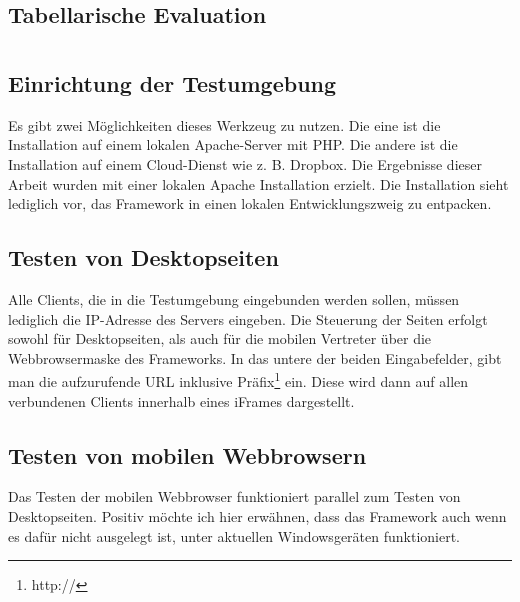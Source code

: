 	\subsection{Tabellarische Evaluation}


	\pagebreak			
	\section{}
		\subsection {Einrichtung der Testumgebung}
		Es gibt zwei Möglichkeiten dieses Werkzeug zu nutzen. Die eine ist die Installation auf einem lokalen \Gls{Apache}-Server mit \Gls{PHP}. Die andere ist die Installation auf einem \Gls{Cloud}-Dienst wie z. B. Dropbox. Die Ergebnisse dieser Arbeit wurden mit einer lokalen \Gls{Apache} Installation erzielt. Die Installation sieht lediglich vor, das \Gls{Framework} in einen lokalen Entwicklungszweig zu entpacken.
		
		\subsection{Testen von Desktopseiten}
		Alle Clients, die in die Testumgebung eingebunden werden sollen, müssen lediglich die IP-Adresse des Servers eingeben.
		Die Steuerung der Seiten erfolgt sowohl für Desktopseiten, als auch für die mobilen Vertreter über die \Gls{Webbrowser}maske des \Gls{Framework}s. In das untere der beiden Eingabefelder, gibt man die aufzurufende URL inklusive Präfix\footnote{http://} ein. Diese wird dann auf allen verbundenen Clients innerhalb eines \gls{iFrame}s dargestellt. 
				
		 \subsection{Testen von mobilen \Gls{Webbrowser}n}
		 Das Testen der mobilen \Gls{Webbrowser} funktioniert parallel zum Testen von Desktopseiten. Positiv möchte ich hier erwähnen, dass das \Gls{Framework} auch wenn es dafür nicht ausgelegt ist, unter aktuellen Windowsgeräten funktioniert.			
		
